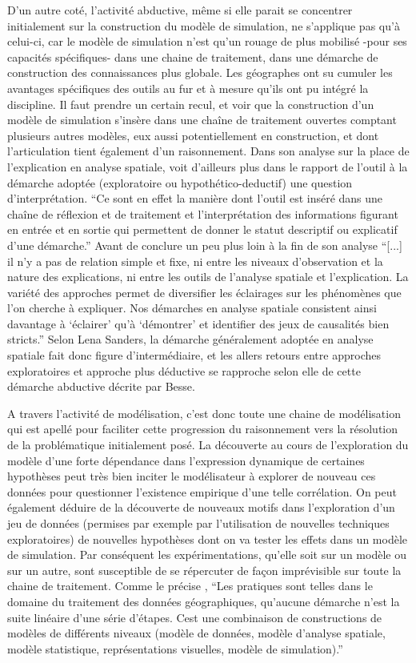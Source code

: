 D'un autre coté, l'activité abductive, même si elle parait se concentrer initialement sur la construction du modèle de simulation, ne s'applique pas qu'à celui-ci, car le modèle de simulation n'est qu'un rouage de plus mobilisé -pour ses capacités spécifiques- dans une chaine de traitement, dans une démarche de construction des connaissances plus globale. Les géographes ont su cumuler les avantages spécifiques des outils au fur et à mesure qu'ils ont pu intégré la discipline. Il faut prendre un certain recul, et voir que la construction d'un modèle de simulation s'insère dans une chaîne de traitement ouvertes comptant plusieurs autres modèles, eux aussi potentiellement en construction, et dont l'articulation tient également d'un raisonnement. Dans son analyse sur la place de l'explication en analyse spatiale, \textcite{Sanders2000} voit d'ailleurs plus dans le rapport de l'outil à la démarche adoptée (exploratoire ou hypothético-deductif) une question d'interprétation. \enquote{Ce sont en effet la manière dont l'outil est inséré dans une chaîne de réflexion et de traitement et l'interprétation des informations figurant en entrée et en sortie qui permettent de donner le statut descriptif ou explicatif d'une démarche.} Avant de conclure un peu plus loin à la fin de son analyse \enquote{[...] il n'y a pas de relation simple et fixe, ni entre les niveaux d'observation et la nature des explications, ni entre les outils de l'analyse spatiale et l'explication. La variété des approches permet de diversifier les éclairages sur les phénomènes que l'on cherche à expliquer. Nos démarches en analyse spatiale consistent ainsi davantage à \enquote{éclairer} qu'à \enquote{démontrer} et identifier des jeux de causalités bien stricts.} Selon Lena Sanders, la démarche généralement adoptée en analyse spatiale fait donc figure d'intermédiaire, et les allers retours entre approches exploratoires et approche plus déductive se rapproche selon elle de cette démarche abductive décrite par Besse.

A travers l'activité de modélisation, c'est donc toute une chaine de  modélisation qui est apellé pour faciliter cette progression du raisonnement vers la résolution de la problématique initialement posé. La découverte au cours de l'exploration du modèle d'une forte dépendance dans l'expression dynamique de certaines hypothèses peut très bien inciter le modélisateur à explorer de nouveau ces données pour questionner l'existence empirique d'une telle corrélation. On peut également déduire de la découverte de nouveaux motifs dans l'exploration d'un jeu de données (permises par exemple par l'utilisation de nouvelles techniques exploratoires) de nouvelles hypothèses dont on va tester les effets dans un modèle de simulation. Par conséquent les expérimentations, qu'elle soit sur un modèle ou sur un autre, sont susceptible de se répercuter de façon imprévisible sur toute la chaine de traitement. Comme le précise \textcite[63]{Mathian2015}, \enquote{Les pratiques sont telles dans le domaine du traitement des données géographiques, qu'aucune démarche n'est la suite linéaire d'une série d'étapes. Cest une combinaison de constructions de modèles de différents niveaux (modèle de données, modèle d'analyse spatiale, modèle statistique, représentations visuelles, modèle de simulation).}

